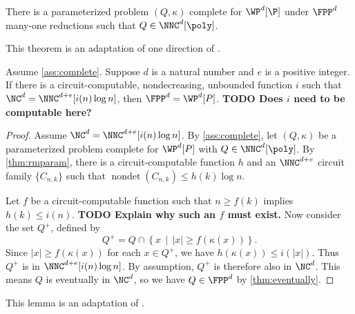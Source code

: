 \documentclass{article}
\newcommand{\todo}[1]{\textbf{TODO #1}}
\DeclareMathOperator{\nondet}{nondet}
\begin{document}
\begin{assumption}\label{ass:complete}
  There is a parameterized problem $(Q, \kappa)$ complete for $\WP^d[\P]$ under $\FPP^d$ many-one reductions such that $Q \in \NNC^d[\poly]$.
\end{assumption}

This theorem is an adaptation of one direction of \autocite[Theorem~3.29]{fg06}.

\begin{theorem}
  Assume \autoref{ass:complete}.
  Suppose $d$ is a natural number and $e$ is a positive integer.
  If there is a circuit-computable, nondecreasing, unbounded function $i$ such that $\NC^d = \NNC^{d + e}[i(n) \log n]$, then $\FPP^d = \WP^d[P]$.
  \todo{Does $i$ need to be computable here?}
\end{theorem}
\begin{proof}
  Assume $\NC^d = \NNC^{d + e}[i(n) \log n]$.
  By \autoref{ass:complete}, let $(Q, \kappa)$ be a parameterized problem complete for $\WP^d[P]$ with $Q \in \NNC^d[\poly]$.
  By \autoref{thm:rmparam}, there is a circuit-computable function $h$ and an $\NNC^{d + e}$ circuit family $\{C_{n, k}\}$ such that $\nondet(C_{n, k}) \leq h(k) \log n$.

  Let $f$ be a circuit-computable function such that $n \geq f(k)$ implies $h(k) \leq i(n)$.
  \todo{Explain why such an $f$ must exist.}
  Now consider the set $Q^+$, defined by
  \[
  Q^+ = Q \cap \left\{ x \, \middle| \, |x| \geq f(\kappa(x)) \right\}.
  \]
  Since $|x| \geq f(\kappa(x))$ for each $x \in Q^+$, we have $h(\kappa(x)) \leq i(|x|)$.
  Thus $Q^+$ is in $\NNC^{d + e}[i(n) \log n]$.
  By assumption, $Q^+$ is therefore also in $\NC^d$.
  This means $Q$ is eventually in $\NC^d$, so we have $Q \in \FPP^d$ by \autoref{thm:eventually}.
\end{proof}

This lemma is an adaptation of \autocite[Lemma~3.24]{fg06}.
\end{document}

